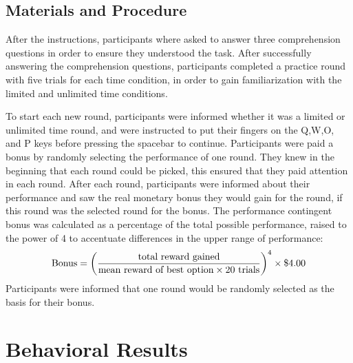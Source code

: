 \subsection{Materials and Procedure}
After the instructions, participants where asked to answer three comprehension questions in order to ensure they understood the task. After successfully answering the comprehension questions, participants completed a practice round with five trials for each time condition, in order to gain familiarization with the limited and unlimited time conditions.  

To start each new round, participants were informed whether it was a limited or unlimited time round, and were instructed to put their fingers on the Q,W,O, and P keys before pressing the spacebar to continue.
Participants were paid a bonus by randomly selecting the performance of one round. They knew in the beginning that each round could be picked, this ensured that they paid attention in each round. 
After each round, participants were informed about their performance and saw the real monetary bonus they would gain for the round, if this round was the selected round for the bonus.
The performance contingent bonus was calculated as a percentage of the total possible performance, raised to the power of 4 to accentuate differences in the upper range of performance:$$\textup{Bonus} = \left(\frac{\textup{total reward gained}}{\textup{mean reward of best option} \times 20 \textup{ trials}}\right)^4 \times \$4.00$$
Participants were informed that one round would be randomly selected as the basis for their bonus. 

\section{Behavioral Results}
